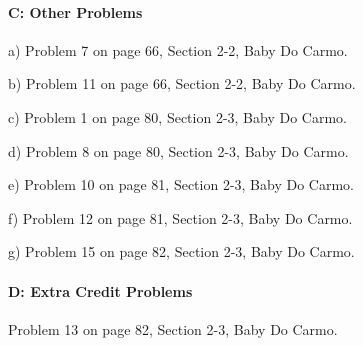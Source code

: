 \documentclass[12pt]{article}
\begin{document}
\paragraph{C: Other Problems}
\begin{itemize}
{\item a) Problem 7 on page 66, Section 2-2, Baby Do Carmo.}
{\item b) Problem 11 on page 66, Section 2-2, Baby Do Carmo.}
{\item c) Problem 1 on page 80, Section 2-3, Baby Do Carmo.}
{\item d) Problem 8 on page 80, Section 2-3, Baby Do Carmo.}
{\item e) Problem 10 on page 81, Section 2-3, Baby Do Carmo.}
{\item f) Problem 12 on page 81, Section 2-3, Baby Do Carmo.}
{\item g) Problem 15 on page 82, Section 2-3, Baby Do Carmo.}
\end{itemize}

\paragraph{D: Extra Credit Problems}
\begin{itemize}
{\item Problem 13 on page 82, Section 2-3, Baby Do Carmo.}
\end{itemize}
\end{document}
